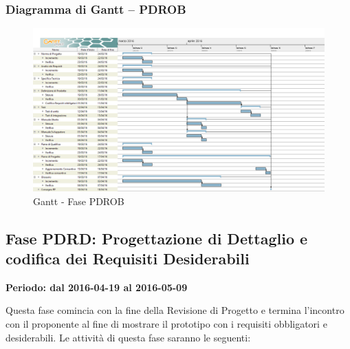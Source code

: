 \documentclass[../PianoProgetto.tex]{subfiles}
\begin{document}
		\subsubsection{Diagramma di Gantt – PDROB}
			\begin{figure}[!h]
				\centering
				\includegraphics[width=\textwidth]{gantt_png/4-requisiti_obbligatori}
				\caption{Gantt - Fase PDROB}
				\label{fig:Gantt - Fase PDROB}
			\end{figure}
\newpage
	\subsection{Fase PDRD: Progettazione di Dettaglio e codifica dei Requisiti Desiderabili}
		\textbf{Periodo: dal 2016-04-19 al 2016-05-09}
		
		Questa fase comincia con la fine della Revisione di Progetto e termina l’incontro con il proponente al fine di mostrare il prototipo con i requisiti obbligatori e desiderabili. Le attività di questa fase saranno le seguenti:
\end{document}
